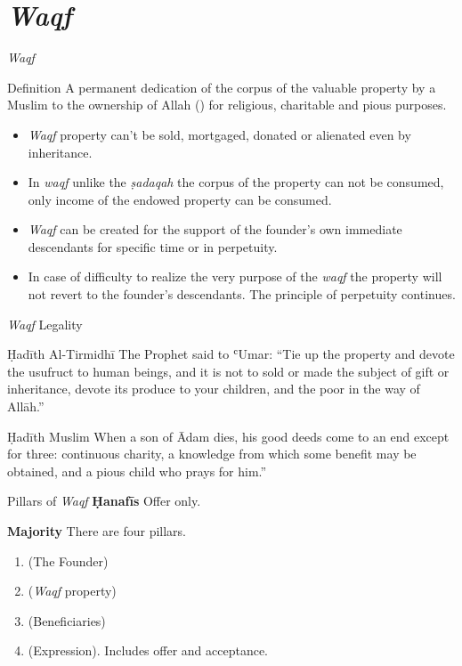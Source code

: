 \section{\textit{Waqf} \hfill {}}

\begin{frame}{\textit{Waqf} \hfill {}}
\begin{block}{Definition}
A permanent dedication of the corpus of the valuable property by a Muslim to the ownership of Allah ({}) for religious, charitable and pious purposes.
\end{block}
\end{frame}

\begin{frame}
\begin{itemize}
\item  \textit{Waqf} property can't be sold, mortgaged, donated or alienated even by inheritance.
\item In \textit{waqf} unlike the \textit{ṣadaqah} the corpus of the property can not be consumed, only income of the endowed property can be consumed.
\item \textit{Waqf} can be created for the support of the founder’s own immediate descendants for specific time or in perpetuity. 
\item In case of difficulty to realize the very purpose of the \textit{waqf} the property will not revert to the founder’s descendants. The principle of perpetuity continues.
\end{itemize}
\end{frame}

\begin{frame}{\textit{Waqf} Legality}
\begin{block}{Ḥadīth \hfill Al-Tirmidhī}
The Prophet \pbuh said to ʿUmar:
“Tie up the property and devote the usufruct to human beings, and it is not to sold or made the subject of gift or inheritance, devote its produce to your children, and the poor in the way of Allāh.”
\end{block}
\begin{block}{Ḥadīth \hfill Muslim}
When a son of Ādam dies, his good deeds come to an end except for three: continuous charity, a knowledge from which some benefit may be obtained, and a pious child who prays for him.”
\end{block}
\end{frame}

\begin{frame}{Pillars of \textit{Waqf} \hfill {}}
\textbf{Ḥanafīs} Offer only.

\textbf{Majority} There are four pillars.

\begin{enumerate}
\item {} (The Founder)
\item {} (\textit{Waqf} property)
\item {} (Beneficiaries)
\item {} (Expression). Includes offer and acceptance.
\end{enumerate}
\end{frame}

